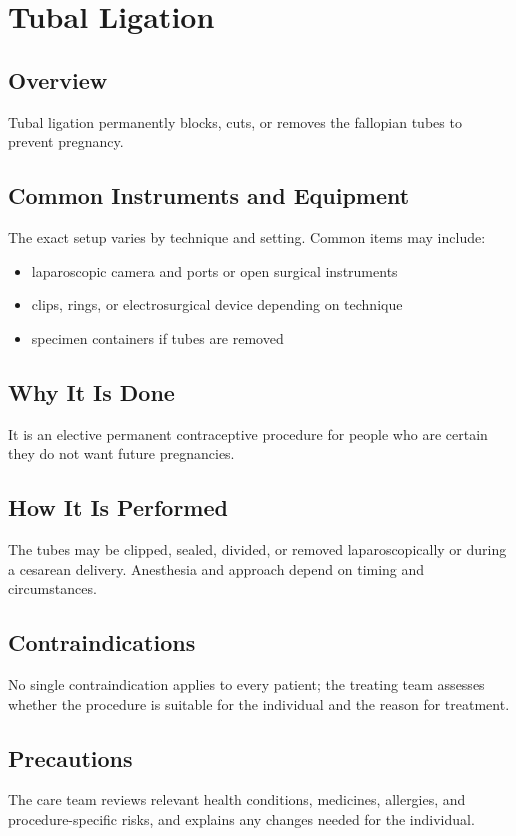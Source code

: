 \chapter{Tubal Ligation}
\section*{Overview}
Tubal ligation permanently blocks, cuts, or removes the fallopian tubes to prevent pregnancy.
\section*{Common Instruments and Equipment}
The exact setup varies by technique and setting. Common items may include:
\begin{itemize}[nosep,leftmargin=*]
  \item laparoscopic camera and ports or open surgical instruments
  \item clips, rings, or electrosurgical device depending on technique
  \item specimen containers if tubes are removed
\end{itemize}

\section*{Why It Is Done}
It is an elective permanent contraceptive procedure for people who are certain they do not want future pregnancies.
\section*{How It Is Performed}
The tubes may be clipped, sealed, divided, or removed laparoscopically or during a cesarean delivery. Anesthesia and approach depend on timing and circumstances.
\section*{Contraindications}
No single contraindication applies to every patient; the treating team assesses whether the procedure is suitable for the individual and the reason for treatment.

\section*{Precautions}
The care team reviews relevant health conditions, medicines, allergies, and procedure-specific risks, and explains any changes needed for the individual.

